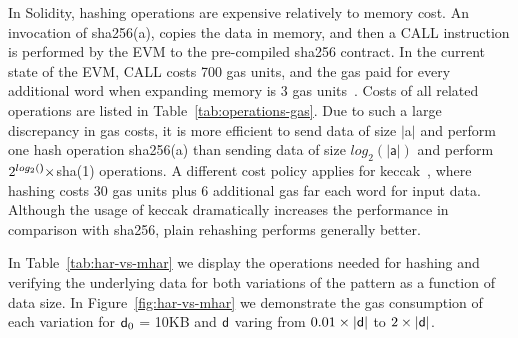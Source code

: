 In Solidity, hashing operations are expensive relatively to memory cost. An
invocation of \textsf{sha256}(\textsf{a}), copies the data in memory, and then
a \textsf{CALL} instruction is performed by the EVM to the pre-compiled
\textsf{sha256} contract.  In the current state of the EVM, \textsf{CALL} costs
700 gas units, and the gas paid for every additional word when expanding memory
is 3 gas units~\cite{wood}. Costs of all related operations are listed in
Table~\ref{tab:operations-gas}. Due to such a large discrepancy in gas costs,
it is more efficient to send data of size $|$\textsf{a}$|$ and perform one hash
operation \textsf{sha256}(a) than sending data of size $log_2(|\textsf{a}|)$
and perform $2^{log_2(\textsf)} \times$\textsf{sha}(1) operations. A different
cost policy applies for \textsf{keccak}~\cite{keccak}, where hashing costs 30
gas units plus 6 additional gas far each word for input data. Although the
usage of \textsf{keccak} dramatically increases the performance in comparison
with \textsf{sha256}, plain rehashing performs generally better.



In Table~\ref{tab:har-vs-mhar} we display the operations needed for hashing and
verifying the underlying data for both variations of the pattern as a function
of data size. In Figure~\ref{fig:har-vs-mhar} we demonstrate the gas
consumption of each variation for $\mathsf{d}_0$ = 10KB and $\mathsf{d}$ varing from $0.01
\times|\mathsf{d}|$ to $2\times|\mathsf{d}|$.



